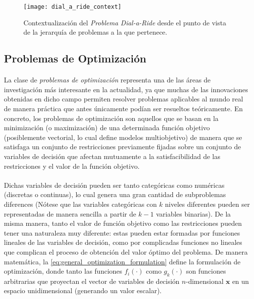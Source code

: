 \documentclass{subfiles}
\begin{document}
      \begin{figure}[ht]
        \centering
        \texttt{[image: dial\_a\_ride\_context]}
        \caption{Contextualización del \emph{Problema Dial-a-Ride} desde el punto de vista de la jerarquía de problemas a la que pertenece.}
        \label{img:formulation_dial_a_ride_contextualization}
      \end{figure}

      \subsection{Problemas de Optimización}
      \label{sec:formulation_optimization_problems}

        \paragraph{}
        La clase de \emph{problemas de optimización} representa una de las áreas de investigación más interesante en la actualidad, ya que muchas de las innovaciones obtenidas en dicho campo permiten resolver problemas aplicables al mundo real de manera práctica que antes únicamente podían ser resueltos teóricamente. En concreto, los problemas de optimización son aquellos que se basan en la minimización (o maximización) de una determinada función objetivo (posiblemente vectorial, lo cual define modelos multiobjetivo) de manera que se satisfaga un conjunto de restricciones previamente fijadas sobre un conjunto de variables de decisión que afectan mutuamente a la satisfacibilidad de las restricciones y el valor de la función objetivo.

        \paragraph{}
        Dichas variables de decisión pueden ser tanto categóricas como numéricas (discretas o continuas), lo cual genera una gran cantidad de subproblemas diferences (Nótese que las variables categóricas con $k$ niveles diferentes pueden ser representadas de manera sencilla a partir de $k-1$ variables binarias). De la misma manera, tanto el valor de función objetivo como las restricciones pueden tener una naturaleza muy diferente: estas pueden estar formadas por funciones lineales de las variables de decisión, como por complicadas funciones no lineales que complican el proceso de obtención del valor óptimo del problema. De manera matemática, la \cref{eq:general_optimization_formulation} define la formulación de optimización, donde tanto las funciones $f_i(\cdot)$ como $g_k(\cdot)$ son funciones arbitrarias que proyectan el vector de variables de decisión $n$-dimensional $\mathbf{x}$ en un espacio unidimensional (generando un valor escalar).
\end{document}
